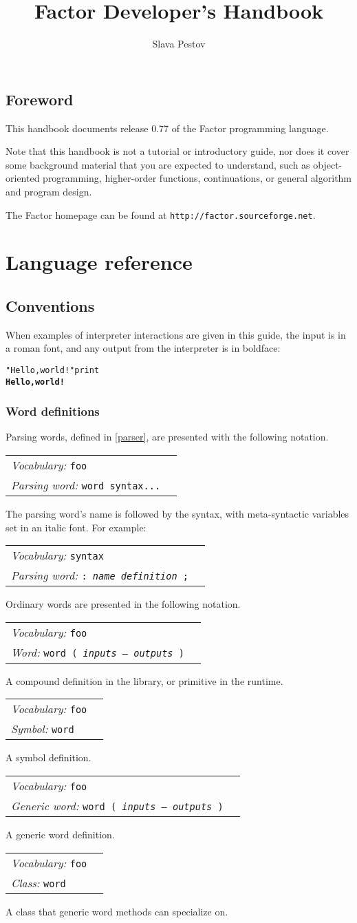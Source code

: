\documentclass{book}
\newcommand{\vocabulary}[1]{\emph{Vocabulary:} \texttt{#1}&\\}
\newcommand{\parsingword}[2]{\index{\texttt{#1}}\emph{Parsing word:} \texttt{#2}&\\}
\newcommand{\ordinaryword}[2]{\index{\texttt{#1}}\emph{Word:} \texttt{#2}&\\}
\newcommand{\symbolword}[1]{\index{\texttt{#1}}\emph{Symbol:} \texttt{#1}&\\}
\newcommand{\classword}[1]{\index{\texttt{#1}}\emph{Class:} \texttt{#1}&\\}
\newcommand{\genericword}[2]{\index{\texttt{#1}}\emph{Generic word:} \texttt{#2}&\\}
\newcommand{\wordtable}[1]{


\begin{tabularx}{12cm}{lX}
\hline
#1
\hline
\end{tabularx}

}
\begin{document}
\title{Factor Developer's Handbook}

\author{Slava Pestov}

\maketitle
\tableofcontents{}

\chapter*{Foreword}

This handbook documents release 0.77 of the Factor programming language.

Note that this handbook is not a tutorial or introductory guide, nor does it cover some background material that you are expected to understand, such as object-oriented programming, higher-order functions, continuations, or general algorithm and program design.

The Factor homepage can be found at \verb|http://factor.sourceforge.net|.

\part{Language reference}

\chapter{Conventions}

When examples of interpreter interactions are given in this guide, the input is in a roman font, and any
output from the interpreter is in boldface:
\begin{alltt}
  "Hello, world!" print
\textbf{Hello, world!}
\end{alltt}

\section{Word definitions}

Parsing words, defined in \ref{parser}, are presented with the following notation.
\wordtable{
\vocabulary{foo}
\parsingword{word}{word syntax...}
}
The parsing word's name is followed by the syntax, with meta-syntactic variables set in an italic font. For example:
\wordtable{
\vocabulary{syntax}
\parsingword{colon}{:~\emph{name} \emph{definition} ;}
}
Ordinary words are presented in the following notation.
\wordtable{
\vocabulary{foo}
\ordinaryword{word}{word ( \emph{inputs} -- \emph{outputs} )}
}
A compound definition in the library, or primitive in the runtime.
\wordtable{
\vocabulary{foo}
\symbolword{word}
}
A symbol definition.
\wordtable{
\vocabulary{foo}
\genericword{word}{word ( \emph{inputs} -- \emph{outputs} )}
}
A generic word definition.
\wordtable{
\vocabulary{foo}
\classword{word}
}
A class that generic word methods can specialize on.
\end{document}

